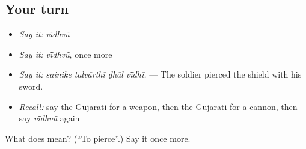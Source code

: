 \subsection*{Your turn}
\begin{itemize}
\raggedright
  \item \emph{Say it:} \emph{vī̃dhvũ}
  \item \emph{Say it:} \emph{vī̃dhvũ}, once more
  \item \emph{Say it:} \emph{sainike talvārthī ḍhāl vī̃dhī.} — The soldier pierced the shield with his sword.
  \item \emph{Recall:} say the Gujarati for a weapon, then the Gujarati for a cannon, then say \emph{vī̃dhvũ} again
\end{itemize}

\begin{tcolorbox}[breakable,colback=teal!4,colframe=teal!35!black,title={Before you move on}]
What does  mean? (\textquotedblleft{}To pierce\textquotedblright{}.) Say it once more.
\end{tcolorbox}
